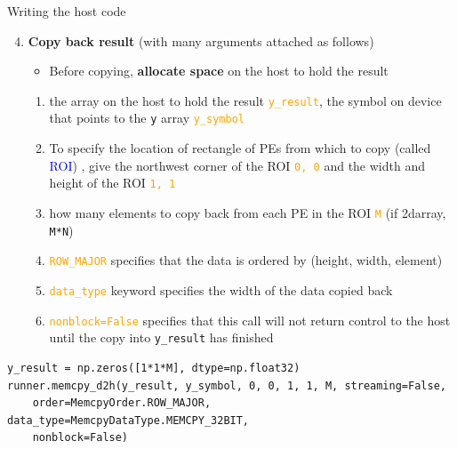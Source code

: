 \documentclass[dvipdfmx, 11pt, aspectratio=169]{beamer}   %
\begin{document}
\begin{frame}[fragile]{Writing the host code}
\begin{enumerate}\setcounter{enumi}{3}
    \item \textbf{Copy back result} (with many arguments attached as follows)
    \begin{itemize}
        \item Before copying, \textbf{allocate space} on the host to hold the result
    \end{itemize}
    \begin{enumerate}
        \item the array on the host to hold the result \textcolor{orange}{\lstinline|y_result|}, the symbol on device that points to the \lstinline|y| array \textcolor{orange}{\lstinline|y_symbol|}
        \item To specify the location of rectangle of PEs from which to copy (called \textcolor{blue}{ROI})%
        , give the northwest corner of the ROI \textcolor{orange}{\lstinline|0, 0|} and the width and height of the ROI \textcolor{orange}{\lstinline|1, 1|}
        \item how many elements to copy back from each PE in the ROI \textcolor{orange}{\lstinline|M|} (if 2darray, \lstinline|M*N|)
        \item \textcolor{orange}{\lstinline|ROW_MAJOR|} specifies that the data is ordered by (height, width, element)
        \item \textcolor{orange}{\lstinline|data_type|} keyword specifies the width of the data copied back
        \item \textcolor{orange}{\lstinline|nonblock=False|} specifies that this call will not return control to the host until the copy into \lstinline|y_result| has finished 
    \end{enumerate}
\end{enumerate}
\begin{lstlisting}[language=CSL]
y_result = np.zeros([1*1*M], dtype=np.float32)
runner.memcpy_d2h(y_result, y_symbol, 0, 0, 1, 1, M, streaming=False,
    order=MemcpyOrder.ROW_MAJOR, data_type=MemcpyDataType.MEMCPY_32BIT,
    nonblock=False)
\end{lstlisting}
\end{frame}
\end{document}
